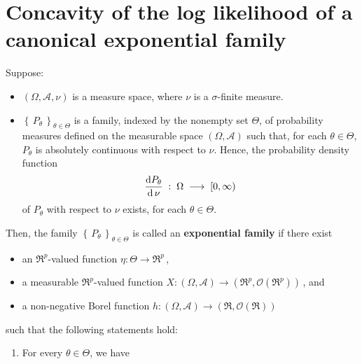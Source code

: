 

\section{Concavity of the log likelihood of a canonical exponential family}
\setcounter{theorem}{0}
\setcounter{equation}{0}

\renewcommand{\theenumi}{\roman{enumi}}
\renewcommand{\labelenumi}{\textnormal{(\theenumi)}$\;\;$}


\begin{definition}
\mbox{}\vskip 0.1cm
\noindent
Suppose:
\begin{itemize}
\item
	$(\Omega,\mathcal{A},\nu)$ is a measure space, where $\nu$ is a $\sigma$-finite measure.
\item
	$\left\{\,P_{\theta}\,\right\}_{\theta \in \Theta}$ is a family, indexed by the nonempty set $\Theta$,
	of probability measures defined on the measurable space $(\Omega,\mathcal{A})$ such that,
	for each $\theta \in \Theta$, $P_{\theta}$ is absolutely continuous with respect to $\nu$.
	Hence, the probability density function
	\begin{equation*}
	\dfrac{\textnormal{d} P_{\theta}}{\textnormal{d}\,\nu} \; : \; \Omega \; \longrightarrow \; [0,\infty)
	\end{equation*}
	of $P_{\theta}$ with respect to $\nu$ exists, for each $\theta \in \Theta$.
\end{itemize}
Then, the family $\left\{\,P_{\theta}\,\right\}_{\theta \in \Theta}$ is called an \textbf{exponential family} if
there exist
\begin{itemize}
\item
	an $\Re^{p}$-valued function $\eta : \Theta \longrightarrow \Re^{p}$\,,
\item
	a measurable $\Re^{p}$-valued function $X : (\Omega,\mathcal{A}) \longrightarrow (\Re^{p},\mathcal{O}(\Re^{p}))$\,, and
\item
	a non-negative Borel function $h : (\Omega,\mathcal{A}) \longrightarrow (\Re,\mathcal{O}(\Re))$
\end{itemize}
such that the following statements hold:
\begin{enumerate}
\item
	For every $\theta \in \Theta$, we have

\end{enumerate}
\end{definition}
